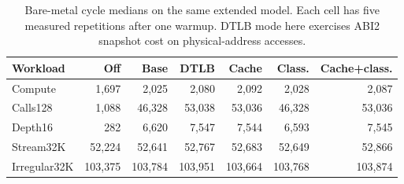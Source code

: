 \begin{table}[t]\centering\small
\begin{tabular}{lrrrrrr}\toprule
Workload & Off & Base & DTLB & Cache & Class. & Cache+class.\\\midrule
Compute & 1,697 & 2,025 & 2,080 & 2,092 & 2,028 & 2,087\\
Calls128 & 1,088 & 46,328 & 53,038 & 53,036 & 46,328 & 53,036\\
Depth16 & 282 & 6,620 & 7,547 & 7,544 & 6,593 & 7,545\\
Stream32K & 52,224 & 52,641 & 52,767 & 52,683 & 52,649 & 52,866\\
Irregular32K & 103,375 & 103,784 & 103,951 & 103,664 & 103,768 & 103,874\\
\bottomrule\end{tabular}
\caption{Bare-metal cycle medians on the same extended model. Each cell has five measured repetitions after one warmup. DTLB mode here exercises ABI2 snapshot cost on physical-address accesses.}\label{tab:barecycles}
\end{table}
